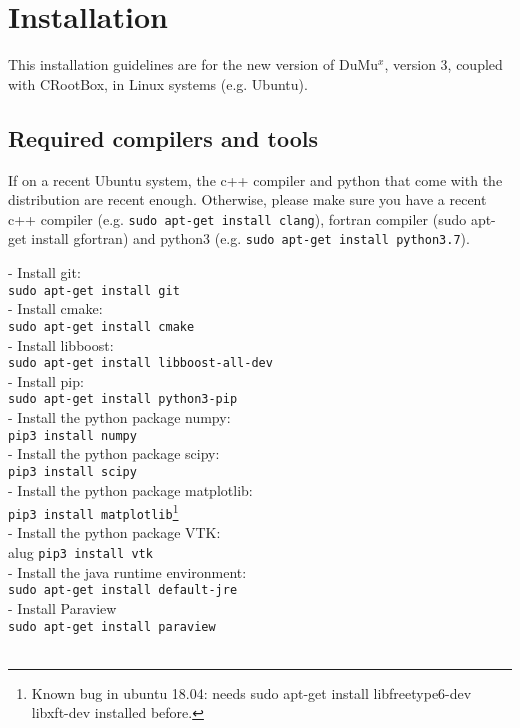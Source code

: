 \chapter*{Installation}
This installation guidelines are for the new version of DuMu$^{x}$, version 3, coupled with CRootBox, in Linux systems (e.g. Ubuntu). 

\section*{Required compilers and tools}
%
If on a recent Ubuntu system, the c++ compiler and python that come with the distribution are recent enough. Otherwise, please make sure you have a recent c++ compiler (e.g. \lstinline{sudo apt-get install clang}), fortran compiler (sudo apt-get install gfortran) and python3 (e.g. \lstinline{sudo apt-get install python3.7}). 

- Install git: \\
\lstinline{sudo apt-get install git}\\
- Install cmake:\\
\lstinline{sudo apt-get install cmake}\\
- Install libboost:\\
\lstinline{sudo apt-get install libboost-all-dev}\\
- Install pip:\\
\lstinline{sudo apt-get install python3-pip}\\
- Install the python package numpy:\\
\lstinline{pip3 install numpy}\\
- Install the python package scipy:\\
\lstinline{pip3 install scipy}\\
- Install the python package matplotlib:\\
\lstinline{pip3 install matplotlib}\footnote{Known bug in ubuntu 18.04: needs sudo apt-get install libfreetype6-dev libxft-dev installed before.}\\
- Install the python package VTK:\\alug
\lstinline {pip3 install vtk}\\
- Install the java runtime environment:\\
\lstinline{sudo apt-get install default-jre}\\
- Install Paraview\\
\lstinline{sudo apt-get install paraview}\\


\lstinline{}\\

